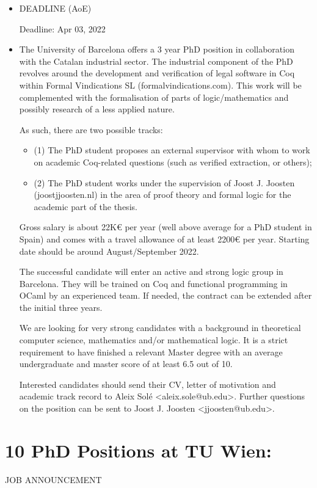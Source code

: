 \documentclass[prodmode,acmtecs]{acmsmall} %
\begin{document}
\begin{itemize}\item  DEADLINE (AoE) 
 
Deadline: Apr 03, 2022 
 
\item  The University of Barcelona offers a 3 year PhD position in collaboration with the Catalan industrial sector. The industrial component of the PhD revolves around the development and verification of legal software in Coq within Formal Vindications SL (formalvindications.com). This work will be complemented with the formalisation of parts of logic/mathematics and possibly research of a less applied nature. 
 
  As such, there are two possible tracks: 
 
\begin{itemize}\item  (1) The PhD student proposes an external supervisor with whom to work on academic Coq-related questions (such as verified extraction, or others);
\item  (2) The PhD student works under the supervision of Joost J. Joosten (joostjjoosten.nl) in the area of proof theory and formal logic for the academic part of the thesis.
\end{itemize} 
  Gross salary is about 22K€ per year (well above average for a PhD student in Spain) and comes with a travel allowance of at least 2200€ per year. Starting date should be around August/September 2022. 
 
  The successful candidate will enter an active and strong logic group in Barcelona. They will be trained on Coq and functional programming in OCaml by an experienced team. If needed, the contract can be extended after the initial three years. 
 
  We are looking for very strong candidates with a background in theoretical computer science, mathematics and/or mathematical logic. It is a strict requirement to have finished a relevant Master degree with an average undergraduate and master score of at least 6.5 out of 10. 
 
  Interested candidates should send their CV, letter of motivation and academic track record to Aleix Solé <aleix.sole@ub.edu>. Further questions on the position can be sent to Joost J. Joosten <jjoosten@ub.edu>. 
 
\end{itemize}\section{10 PhD Positions at TU Wien:}\label{10PhDPositionsatTUWien}JOB ANNOUNCEMENT 
\end{document}
